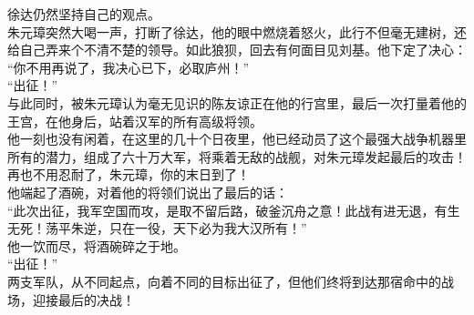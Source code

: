 \begin{multicols}{\theparacolNo}
徐达仍然坚持自己的观点。\\

朱元璋突然大喝一声，打断了徐达，他的眼中燃烧着怒火，此行不但毫无建树，还给自己弄来个不清不楚的领导。如此狼狈，回去有何面目见刘基。他下定了决心：\\

“你不用再说了，我决心已下，必取庐州！”\\

“出征！”\\

与此同时，被朱元璋认为毫无见识的陈友谅正在他的行宫里，最后一次打量着他的王宫，在他身后，站着汉军的所有高级将领。\\

他一刻也没有闲着，在这里的几十个日夜里，他已经动员了这个最强大战争机器里所有的潜力，组成了六十万大军，将乘着无敌的战舰，对朱元璋发起最后的攻击！\\

再也不用忍耐了，朱元璋，你的末日到了！\\

他端起了酒碗，对着他的将领们说出了最后的话：\\

“此次出征，我军空国而攻，是取不留后路，破釜沉舟之意！此战有进无退，有生无死！荡平朱逆，只在一役，天下必为我大汉所有！”\\

他一饮而尽，将酒碗碎之于地。\\

“出征！”\\

两支军队，从不同起点，向着不同的目标出征了，但他们终将到达那宿命中的战场，迎接最后的决战！\\
\ifnum{}
	\end{multicols}
\fi
\newpage
